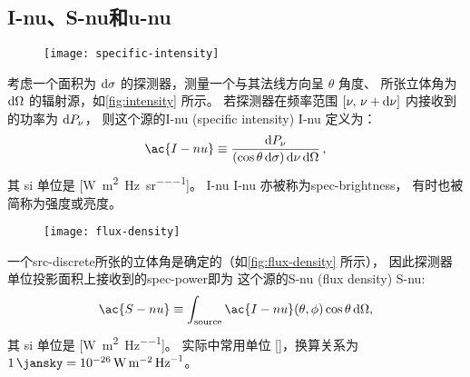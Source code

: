 \subsection{\acl*{I-nu}、\acl*{S-nu}和\acl*{u-nu}}

\begin{figure}[htp]
  \centering
  \texttt{[image: specific-intensity]}
  \label{fig:intensity}
\end{figure}

考虑一个面积为 $\mathrm{d}\sigma$ 的探测器，测量一个与其法线方向呈 $\theta$ 角度、
所张立体角为 $\mathrm{d}\Omega$ 的辐射源，如\autoref{fig:intensity} 所示。
若探测器在频率范围 $[\nu, \,\nu+\mathrm{d}\nu]$ 内接收到的功率为 $\mathrm{d}P_{\nu}$，
则这个源的\acl{I-nu} (specific intensity) \ac{I-nu} 定义为：
\begin{equation}
  \label{eq:intensity}
  \ac{I-nu} \equiv
    \frac{\D{P_{\nu}}}{(\cos\theta\,\D{\sigma}) \,\D{\nu} \,\D{\Omega}} \,,
\end{equation}
其 \ac{si} 单位是 [\si{\watt\per\square\meter\per\hertz\per\steradian}]。
\acl{I-nu} \ac{I-nu} 亦被称为\ac{spec-brightness}，
有时也被简称为强度或亮度。

\begin{figure}[htp]
  \centering
  \texttt{[image: flux-density]}
  \label{fig:flux-density}
\end{figure}

一个\ac{src-discrete}所张的立体角是确定的（如\autoref{fig:flux-density} 所示），
因此探测器单位投影面积上接收到的\ac{spec-power}即为
这个源的\acl{S-nu} (flux density) \ac{S-nu}:
\begin{equation}
  \label{eq:flux-density}
  \ac{S-nu} \equiv
    \int_{\R{source}} \ac{I-nu}(\theta,\phi) \cos\theta \,\D{\Omega} ,
\end{equation}
其 \ac{si} 单位是 [\si{\watt\per\square\meter\per\hertz}]。
实际中常用单位 [\si{\jansky}]，换算关系为
$\SI{1}{\jansky} = \SI{e-26}{\watt\per\square\meter\per\hertz}$。

